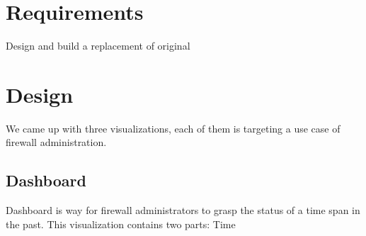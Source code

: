 \section{Requirements}
Design and build a replacement of original
\section{Design}
We came up with three visualizations, each of them is targeting a use case of firewall 
administration. 
\subsection{Dashboard}
Dashboard is way for firewall administrators to grasp the status of a time span in the 
past. This visualization contains two parts: Time